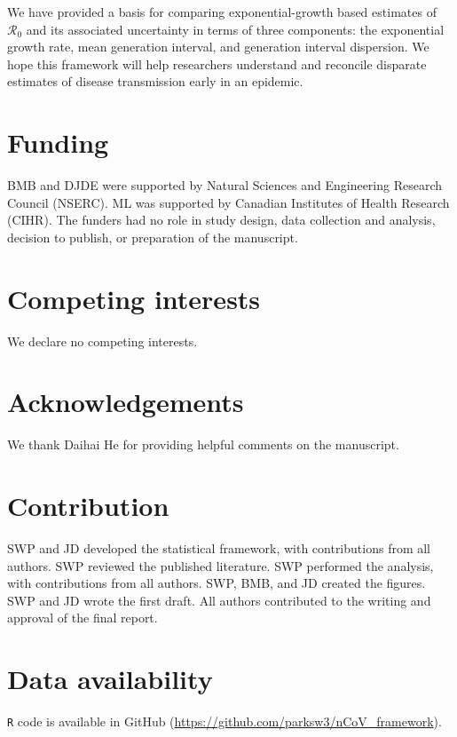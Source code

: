 \documentclass[12pt]{article}
\newcommand{\Ro}{\ensuremath{{\mathcal R}_{0}}\xspace}
\begin{document}
We have provided a basis for comparing exponential-growth based estimates of \Ro and its associated uncertainty in terms of three components: the exponential growth rate, mean generation interval, and generation interval dispersion. 
We hope this framework will help researchers understand and reconcile disparate estimates of disease transmission early in an epidemic.

\pagebreak

\section*{Funding}

BMB and DJDE were supported by Natural Sciences and Engineering Research Council (NSERC). ML was supported by Canadian Institutes of Health Research (CIHR). The funders had no role in study design, data collection and analysis, decision to publish, or preparation of the manuscript.

\section*{Competing interests}

We declare no competing interests.

\section*{Acknowledgements}

We thank Daihai He for providing helpful comments on the manuscript.

\section*{Contribution}

SWP and JD developed the statistical framework, with contributions from all authors. 
SWP reviewed the published literature.
SWP performed the analysis, with contributions from all authors.
SWP, BMB, and JD created the figures. 
SWP and JD wrote the first draft.
All authors contributed to the writing and approval of the final report.

\section*{Data availability}

\texttt{R} code is available in GitHub (\url{https://github.com/parksw3/nCoV_framework}).
\end{document}
